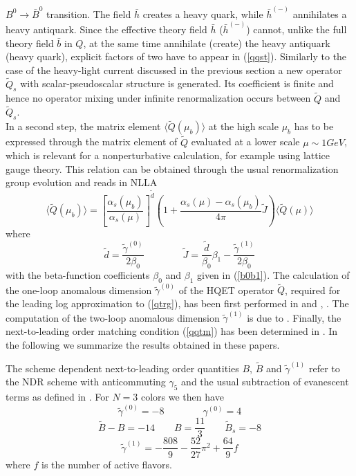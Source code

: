 $B^0\to\bar B^0$ transition. The field $\bar h$ creates a heavy quark,
while $\bar h^{(-)}$ annihilates a heavy antiquark. Since the
effective theory field $\bar h$ ($\bar h^{(-)}$) cannot, unlike the
full theory field $\bar b$ in $Q$, at the same time annihilate (create)
the heavy antiquark (heavy quark), explicit factors of two have to appear
in (\ref{qqst}). Similarly to the case of the heavy-light current
discussed in the previous section a new operator $\tilde Q_s$ with
scalar-pseudoscalar structure is generated. Its coefficient is finite
and hence no operator mixing under infinite renormalization occurs
between $\tilde Q$ and $\tilde Q_s$.
\\
In a second step, the matrix element $\langle\tilde Q(\mu_b)\rangle$
at the high scale $\mu_b$ has to be expressed through the matrix
element of $\tilde Q$ evaluated at a lower scale $\mu\sim 1 GeV$,
which is relevant for a nonperturbative calculation, for example
using lattice gauge theory. This relation can be obtained through the
usual renormalization group evolution and reads in NLLA
\begin{equation}\label{qtrg}
\langle\tilde Q(\mu_b)\rangle=
\left[\frac{\alpha_s(\mu_b)}{\alpha_s(\mu)}\right]^{\tilde d}
\left(1+\frac{\alpha_s(\mu)-\alpha_s(\mu_b)}{4\pi}\tilde J\right)
\langle\tilde Q(\mu)\rangle
\end{equation}
where
\begin{equation}\label{djt}
\tilde d=\frac{\tilde\gamma^{(0)}}{2\beta_0}\qquad\qquad
\tilde J=\frac{\tilde d}{\beta_0}\beta_1-\frac{\tilde\gamma^{(1)}}{2\beta_0}
\end{equation}
with the beta-function coefficients $\beta_0$ and $\beta_1$ given in
(\ref{b0b1}). The calculation of the one-loop anomalous dimension
$\tilde\gamma^{(0)}$ of the HQET operator $\tilde Q$, required for the
leading log approximation to (\ref{qtrg}), has been first performed in
\cite{voloshinshifman:87} and \cite{politzerwise:88a},
\cite{politzerwise:88b}. The computation of the two-loop anomalous
dimension $\tilde\gamma^{(1)}$ is due to \cite{gimenez:93}. Finally,
the next-to-leading order matching condition (\ref{qqtm}) has been
determined in \cite{flynnetal:91}.  In the following we summarize the
results obtained in these papers.

The scheme dependent next-to-leading order quantities $B$, $\tilde B$
and $\tilde\gamma^{(1)}$ refer to the NDR scheme with anticommuting
$\gamma_5$ and the usual subtraction of evanescent terms as defined
in \cite{burasweisz:90}. For $N=3$ colors we then have
\begin{equation}\label{ggt}
\tilde\gamma^{(0)}=-8\qquad\qquad\gamma^{(0)}=4
\end{equation}
\begin{equation}\label{bbt}
\tilde B-B=-14\qquad B=\frac{11}{3}\qquad \tilde B_s=-8
\end{equation}
\begin{equation}\label{gt1}
\tilde\gamma^{(1)}=-\frac{808}{9}-\frac{52}{27}\pi^2+\frac{64}{9}f
\end{equation}
where $f$ is the number of active flavors.  

